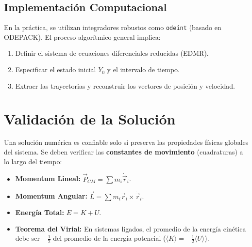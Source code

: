 \documentclass[a4paper]{article}
\begin{document}
\subsection{Implementación Computacional}
En la práctica, se utilizan integradores robustos como \texttt{odeint} (basado en ODEPACK). El proceso algorítmico general implica:
\begin{enumerate}
    \item Definir el sistema de ecuaciones diferenciales reducidas (EDMR).
    \item Especificar el estado inicial $Y_0$ y el intervalo de tiempo.
    \item Extraer las trayectorias y reconstruir los vectores de posición y velocidad.
\end{enumerate}

\section{Validación de la Solución}

Una solución numérica es confiable solo si preserva las propiedades físicas globales del sistema. Se deben verificar las \textbf{constantes de movimiento} (cuadraturas) a lo largo del tiempo:
\begin{itemize}
    \item \textbf{Momentum Lineal:} $\vec{P}_{CM} = \sum m_i \dot{\vec{r}}_i$.
    \item \textbf{Momentum Angular:} $\vec{L} = \sum m_i \vec{r}_i \times \dot{\vec{r}}_i$.
    \item \textbf{Energía Total:} $E = K + U$.
    \item \textbf{Teorema del Virial:} En sistemas ligados, el promedio de la energía cinética debe ser $-\frac{1}{2}$ del promedio de la energía potencial ($\langle K \rangle = -\frac{1}{2} \langle U \rangle$).
\end{itemize}


 
\end{document}
